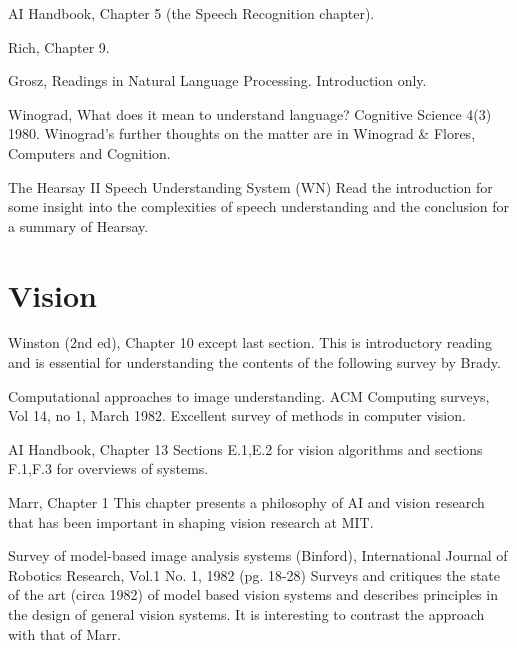 \begin{required}

 \paper AI Handbook, Chapter 5 (the Speech Recognition chapter).

 \paper Rich, Chapter 9.

 \paper Grosz, Readings in Natural Language Processing.  Introduction
only.

 \paper Winograd, What does it mean to understand language?  Cognitive
Science 4(3) 1980.  Winograd's further thoughts on the matter are in
Winograd \& Flores, Computers and Cognition.

\end{required}

\begin{optional}

 \paper   The Hearsay II Speech Understanding System (WN)
     Read the introduction for some insight into the complexities of
     speech understanding and the conclusion for a summary of Hearsay.

\end{optional}

\section{Vision}
\label{sec:vision}

\begin{required}

  \paper Winston (2nd ed), Chapter 10 except last section.  This is
introductory reading and is essential for understanding the contents
of the following survey by Brady.

  \paper Computational approaches to image understanding.  ACM
Computing surveys, Vol 14, no 1, March 1982.  Excellent survey of
methods in computer vision.

  \paper AI Handbook, Chapter 13 Sections E.1,E.2 for vision
algorithms and sections F.1,F.3 for overviews of systems.

\end{required}

\begin{optional}
      
  \paper Marr, Chapter 1 This chapter presents a philosophy of AI and
vision research that has been important in shaping vision research at
MIT.

  \paper   Survey of model-based image analysis systems (Binford),
      International Journal of Robotics Research, Vol.1 No. 1, 1982 (pg. 18-28)
      Surveys and critiques the state of the art (circa 1982) of model
      based vision systems and describes principles in the design of
      general vision systems. It is interesting to contrast the approach
      with that of Marr.

\end{optional}

